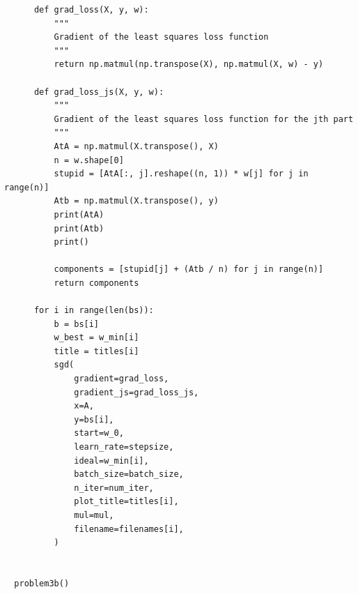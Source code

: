\begin{verbatim}
      def grad_loss(X, y, w):
          """
          Gradient of the least squares loss function
          """
          return np.matmul(np.transpose(X), np.matmul(X, w) - y)

      def grad_loss_js(X, y, w):
          """
          Gradient of the least squares loss function for the jth part
          """
          AtA = np.matmul(X.transpose(), X)
          n = w.shape[0]
          stupid = [AtA[:, j].reshape((n, 1)) * w[j] for j in range(n)]
          Atb = np.matmul(X.transpose(), y)
          print(AtA)
          print(Atb)
          print()

          components = [stupid[j] + (Atb / n) for j in range(n)]
          return components

      for i in range(len(bs)):
          b = bs[i]
          w_best = w_min[i]
          title = titles[i]
          sgd(
              gradient=grad_loss,
              gradient_js=grad_loss_js,
              x=A,
              y=bs[i],
              start=w_0,
              learn_rate=stepsize,
              ideal=w_min[i],
              batch_size=batch_size,
              n_iter=num_iter,
              plot_title=titles[i],
              mul=mul,
              filename=filenames[i],
          )


  problem3b()
\end{verbatim}

